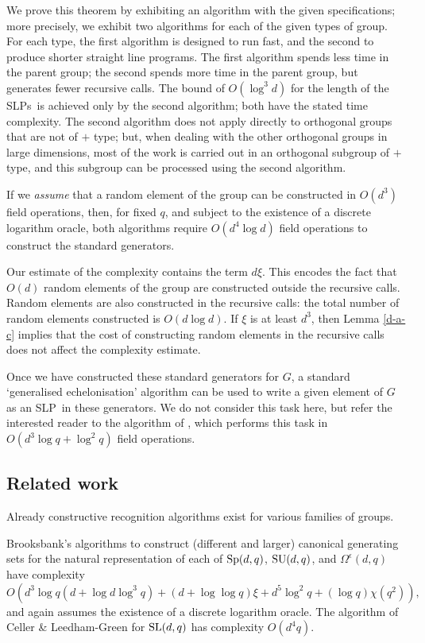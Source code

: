 \documentclass[12pt]{article}
\def\SL{{\rm SL}}
\def\Oh{O}  %
\def\Sp{{\rm Sp}}
\def\SU{{\rm SU}}
\def\SLP{{\rm SLP}}
\def\SLPs{{\rm SLPs}}
\begin{document}
We prove this theorem by  exhibiting  an  algorithm with the given
specifications; more precisely, we exhibit two  algorithms for each of the
given types of group. For each type, the first algorithm is designed
to run fast, and the second  to produce shorter straight line programs.
The first algorithm spends less time in the parent group; the second
spends more time in the parent  group, but generates fewer
recursive calls. The bound of $\Oh(\log^3 d)$ for the length of the
\SLPs\ is achieved only by the second algorithm;
both have the stated time complexity.  
The second algorithm does not apply directly to orthogonal groups 
that are not of $+$ type;
but, when dealing with the other orthogonal groups in large 
dimensions, most of the work is
carried out in an orthogonal subgroup of $+$ type, and this subgroup 
can be processed using the second algorithm.

If we {\it assume} that a random element of the group can be 
constructed in $\Oh(d^3)$ field operations, then, for fixed $q$,
and subject to the existence of a discrete logarithm oracle,
both algorithms require $\Oh(d^4\log d)$ field operations to construct 
the standard generators. 

Our estimate of the complexity contains the term $d\xi$.  This encodes the
fact that $\Oh(d)$ random elements of the group are constructed outside
the recursive calls. Random elements are also constructed
in the recursive calls: the total number of random elements 
constructed is $\Oh(d\log d)$.  If $\xi$ is at least $d^3$, 
then Lemma \ref{d-a-c} implies that the cost of constructing 
random elements in the recursive calls does not affect 
the complexity estimate.

Once we have constructed these standard generators for $G$,
a standard `generalised echelonisation' algorithm can 
be used to write a given element of $G$ 
as an \SLP\ in these generators.
We do not consider this task here, but refer 
the interested reader to the algorithm
of \cite[Section 5]{Brooksbank03},
which performs this task in 
$\Oh(d^3\log q + \log^2 q)$ field operations. 

\subsection{Related work}
Already constructive recognition algorithms exist 
for various families of groups. 

Brooksbank's algorithms \cite{Brooksbank03} to construct
(different and larger) canonical generating sets for the natural 
representation of each of 
$\Sp(d, q)$, $\SU(d, q)$, and $\Omega^\epsilon(d, q)$ 
have complexity 
$$\Oh(d^3 \log q (d + \log d \log^3 q) + (d + \log \log q)\xi + d^5 \log^2 q
 + (\log q)\chi (q^2)),$$
and again assumes the existence of a discrete logarithm oracle.
The algorithm of Celler \& Leedham-Green \cite{CellerLeedhamGreen98}
for $\SL(d, q)$ has complexity $\Oh(d^4  q)$.
\end{document}
